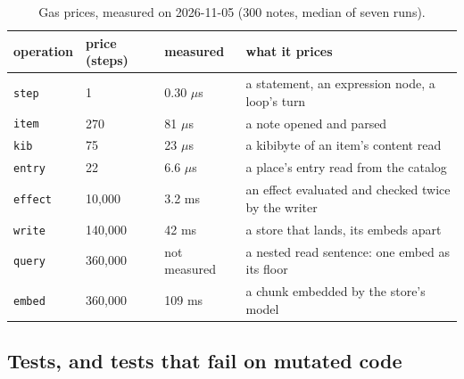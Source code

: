 \documentclass[11pt]{article}
\theoremstyle{plain}
\theoremstyle{definition}
\theoremstyle{remark}
\newcommand{\code}[1]{\texttt{#1}}
\begin{document}
\begin{table}[t]
\centering\small
\begin{tabular}{llll}
\toprule
operation & price (steps) & measured & what it prices \\
\midrule
\code{step} & 1 & 0.30 $\mu$s & a statement, an expression node, a loop's turn \\
\code{item} & 270 & 81 $\mu$s & a note opened and parsed \\
\code{kib} & 75 & 23 $\mu$s & a kibibyte of an item's content read \\
\code{entry} & 22 & 6.6 $\mu$s & a place's entry read from the catalog \\
\code{effect} & 10,000 & 3.2 ms & an effect evaluated and checked twice by the writer \\
\code{write} & 140,000 & 42 ms & a store that lands, its embeds apart \\
\code{query} & 360,000 & not measured & a nested read sentence: one embed as its floor \\
\code{embed} & 360,000 & 109 ms & a chunk embedded by the store's model \\
\bottomrule
\end{tabular}
\caption{Gas prices, measured on 2026-11-05 (300 notes, median of seven runs).}
\label{tab:gas}
\end{table}

\subsection{Tests, and tests that fail on mutated code}
\end{document}

